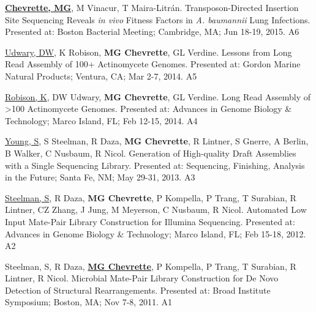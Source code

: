 \begin{cvpubs}
  \cvpub
    {\textbf{\underline{Chevrette, MG}}, M Vinacur, T Maira-Litr\'{a}n.  Transposon-Directed Insertion Site Sequencing Reveals \textit{in vivo} Fitness Factors in \textit{A. baumannii} Lung Infections.  Presented at: Boston Bacterial Meeting; Cambridge, MA; Jun 18-19, 2015.} %
    {A6} %
    
  \cvpub
    {\underline{Udwary, DW}, K Robison, \textbf{MG Chevrette}, GL Verdine.  Lessons from Long Read Assembly of 100+ Actinomycete Genomes.  Presented at: Gordon Marine Natural Products; Ventura, CA; Mar 2-7, 2014.} %
    {A5} %
    
  \cvpub
    {\underline{Robison, K}, DW Udwary, \textbf{MG Chevrette}, GL Verdine.  Long Read Assembly of >100 Actinomycete Genomes.  Presented at: Advances in Genome Biology \& Technology; Marco Island, FL; Feb 12-15, 2014.} %
    {A4} %

  \cvpub
    {\underline{Young, S}, S Steelman, R Daza, \textbf{MG Chevrette}, R Lintner, S Gnerre, A Berlin, B Walker, C Nusbaum, R Nicol.  Generation of High-quality Draft Assemblies with a Single Sequencing Library.  Presented at: Sequencing, Finishing, Analysis in the Future; Santa Fe, NM; May 29-31, 2013.} %
    {A3} %
    
  \cvpub
    {\underline{Steelman, S}, R Daza, \textbf{MG Chevrette}, P Kompella, P Trang, T Surabian, R Lintner, CZ Zhang, J Jung, M Meyerson, C Nusbaum, R Nicol.  Automated Low Input Mate-Pair Library Construction for Illumina Sequencing.  Presented at: Advances in Genome Biology \& Technology; Marco Island, FL; Feb 15-18, 2012.} %
    {A2} %
    
  \cvpub
    {Steelman, S, R Daza, \underline{\textbf{MG Chevrette}}, P Kompella, P Trang, T Surabian, R Lintner, R Nicol.  Microbial Mate-Pair Library Construction for De Novo Detection of Structural Rearrangements.  Presented at: Broad Institute Symposium; Boston, MA; Nov 7-8, 2011.} %
    {A1} %

\end{cvpubs}